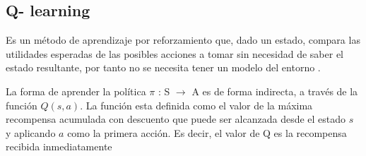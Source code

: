 \subsection{ Q- learning}

Es un método de aprendizaje por reforzamiento que, dado un estado, compara las utilidades esperadas de las posibles acciones a tomar sin necesidad de saber el estado resultante, por tanto no se necesita tener un modelo del entorno \cite{peterNorvig}.

La forma de aprender la política $\pi$ : S $\to$ A es de forma indirecta, a través de la función $Q(s,a)$. La función esta definida como el valor de la máxima recompensa acumulada con descuento que puede ser alcanzada desde el estado $s$ y aplicando $a$ como la primera acción. Es decir, el valor de Q es la recompensa recibida inmediatamente 

